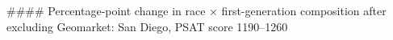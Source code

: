 #### Percentage-point change in race × first-generation composition after excluding Geomarket: San Diego, PSAT score 1190–1260
